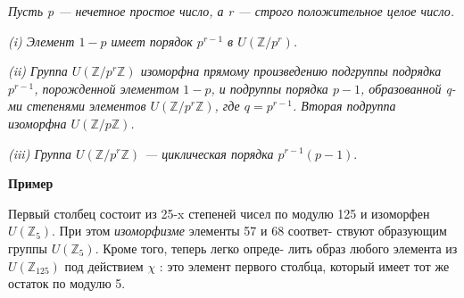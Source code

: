 \vspace{\baselineskip}
\begin{thm}
\slshape{Пусть p --- нечетное простое число, а r --- строго положительное \linebreak целое число.} \par \slshape{(\textit{i}) Элемент $1-p$ имеет порядок $p^{r-1}$ в $U(\mathbb{Z}/p^{r})$.} \par 
\slshape{(\textit{ii}) Группа $U(\mathbb{Z}/p^{r}\mathbb{Z})$ изоморфна прямому произведению подгруппы \linebreak подрядка $p^{r-1}$, порожденной элементом $1-p$, и подруппы порядка $p-1$, \linebreak образованной q-ми степенями элементов  $U(\mathbb{Z}/p^{r}\mathbb{Z})$, где $q=p^{r-1}$. Вторая подруппа изоморфна  $U(\mathbb{Z}/p\mathbb{Z})$}. \par 
\slshape{(\textit{iii}) Группа $U(\mathbb{Z}/p^{r}\mathbb{Z})$ --- циклическая порядка $p^{r-1}(p-1).$}
\end{thm}
\noindent \textbf{Пример} \par
{} \par
Первый столбец состоит из 25-x степеней чисел по модулю 125 и \linebreak изоморфен $U(\mathbb{Z}_{5})$. При этом \textit{изоморфизме} элементы 57 и 68 соответ- \linebreak ствуют образующим группы $U({\mathbb{Z}_{5}})$. Кроме того, теперь легко опреде- \linebreak лить образ любого элемента из $U(\mathbb{Z}_{125})$ под действием $\chi$ : это элемент \linebreak первого столбца, который имеет тот же остаток по модулю 5. \par

\newpage

